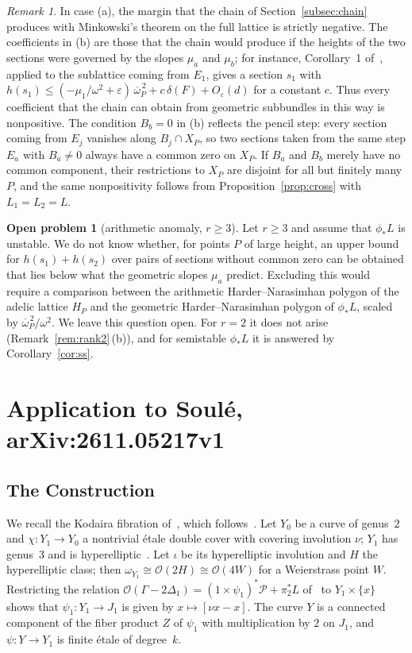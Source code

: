 \documentclass[11pt]{article}
\theoremstyle{definition}
\newtheorem{problem}[theorem]{Open problem}
\theoremstyle{remark}
\newtheorem{remark}[theorem]{Remark}
\newcommand{\OO}{\mathcal{O}}
\newcommand{\ob}{\overline{\omega}}
\begin{document}
\begin{remark}\label{rem:unstable}
In case (a), the margin that the chain of Section~\ref{subsec:chain} produces with
Minkowski's theorem on the full lattice is strictly negative. The coefficients in
(b) are those that the chain would produce if the heights of the two sections were
governed by the slopes $\mu_a$ and $\mu_b$; for instance, Corollary~1
of~\cite{So26}, applied to the sublattice coming from $E_1$, gives a section $s_1$
with
$h(s_1)\le(-\mu_1/\omega^2+\varepsilon)\,\ob_P^{\,2}+c\,\delta(F)+O_\varepsilon(d)$
for a constant $c$. Thus every coefficient that the chain can obtain from
geometric subbundles in this way is nonpositive. The condition $B_b=0$ in (b)
reflects the pencil step: every section coming from $E_j$ vanishes along
$B_j\cap X_P$, so two sections taken from the same step $E_a$ with $B_a\ne 0$
always have a common zero on $X_P$. If $B_a$ and $B_b$ merely have no common
component, their restrictions to $X_P$ are disjoint for all but finitely many $P$,
and the same nonpositivity follows from Proposition~\ref{prop:cross} with
$L_1=L_2=L$.
\end{remark}

\begin{problem}[arithmetic anomaly, $r\ge 3$]\label{prob:anomaly}
Let $r\ge 3$ and assume that $\phi_*L$ is unstable. We do not know whether, for
points $P$ of large height, an upper bound for $h(s_1)+h(s_2)$ over pairs of
sections without common zero can be obtained that lies below what the geometric
slopes $\mu_a$ predict. Excluding this would require a comparison between the
arithmetic Harder--Narasimhan polygon of the adelic lattice $H_P$ and the
geometric Harder--Narasimhan polygon of $\phi_*L$, scaled by
$\ob_P^{\,2}/\omega^2$. We leave this question open. For $r=2$ it does not arise
(Remark~\ref{rem:rank2}\,(b)), and for semistable $\phi_*L$ it is answered by
Corollary~\ref{cor:ss}.
\end{problem}

\section{Application to Soul\'e, arXiv:2611.05217v1}\label{sec:soule}

\subsection{The Construction}
We recall the Kodaira fibration of~\cite[\S\S3, 5]{So26}, which
follows~\cite{Ko67,MD85}. Let $Y_0$ be a curve of genus~$2$ and $\chi\colon
Y_1\to Y_0$ a nontrivial \'etale double cover with covering involution $\nu$;
$Y_1$ has genus~$3$ and is hyperelliptic~\cite[Prop.~4\,i)]{So26}. Let $\iota$ be
its hyperelliptic involution and $H$ the hyperelliptic class; then
$\omega_{Y_1}\cong\OO(2H)\cong\OO(4W)$ for a Weierstrass point $W$. Restricting
the relation $\OO(\Gamma-2\Delta_1)=(1\times\psi_1)^*\mathcal{P}+\pi_2^*L$
of~\cite[\S5.1]{So26} to $Y_1\times\{x\}$ shows that $\psi_1\colon Y_1\to J_1$ is
given by $x\mapsto[\nu x-x]$. The curve $Y$ is a connected component of the fiber
product $Z$ of $\psi_1$ with multiplication by $2$ on $J_1$, and
$\psi\colon Y\to Y_1$ is finite \'etale of degree~$k$.
\end{document}
